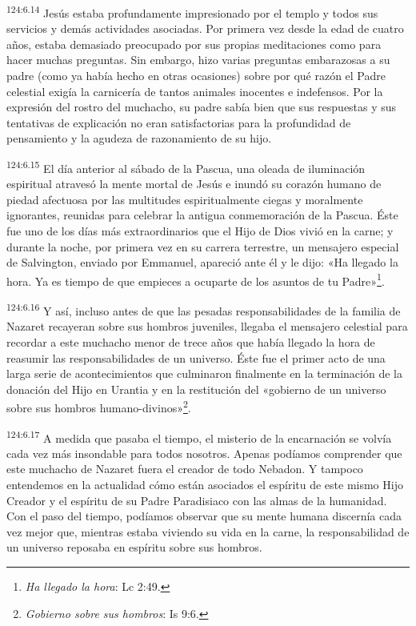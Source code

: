 \par
\textsuperscript{124:6.14} Jesús estaba profundamente impresionado por el templo y todos sus servicios y demás actividades asociadas. Por primera vez desde la edad de cuatro años, estaba demasiado preocupado por sus propias meditaciones como para hacer muchas preguntas. Sin embargo, hizo varias preguntas embarazosas a su padre (como ya había hecho en otras ocasiones) sobre por qué razón el Padre celestial exigía la carnicería de tantos animales inocentes e indefensos. Por la expresión del rostro del muchacho, su padre sabía bien que sus respuestas y sus tentativas de explicación no eran satisfactorias para la profundidad de pensamiento y la agudeza de razonamiento de su hijo.

\par
\textsuperscript{124:6.15} El día anterior al sábado de la Pascua, una oleada de iluminación espiritual atravesó la mente mortal de Jesús e inundó su corazón humano de piedad afectuosa por las multitudes espiritualmente ciegas y moralmente ignorantes, reunidas para celebrar la antigua conmemoración de la Pascua. Éste fue uno de los días más extraordinarios que el Hijo de Dios vivió en la carne; y durante la noche, por primera vez en su carrera terrestre, un mensajero especial de Salvington, enviado por Emmanuel, apareció ante él y le dijo: «Ha llegado la hora. Ya es tiempo de que empieces a ocuparte de los asuntos de tu Padre»\footnote{\textit{Ha llegado la hora}: Lc 2:49.}.

\par
\textsuperscript{124:6.16} Y así, incluso antes de que las pesadas responsabilidades de la familia de Nazaret recayeran sobre sus hombros juveniles, llegaba el mensajero celestial para recordar a este muchacho menor de trece años que había llegado la hora de reasumir las responsabilidades de un universo. Éste fue el primer acto de una larga serie de acontecimientos que culminaron finalmente en la terminación de la donación del Hijo en Urantia y en la restitución del «gobierno de un universo sobre sus hombros humano-divinos»\footnote{\textit{Gobierno sobre sus hombros}: Is 9:6.}.

\par
\textsuperscript{124:6.17} A medida que pasaba el tiempo, el misterio de la encarnación se volvía cada vez más insondable para todos nosotros. Apenas podíamos comprender que este muchacho de Nazaret fuera el creador de todo Nebadon. Y tampoco entendemos en la actualidad cómo están asociados el espíritu de este mismo Hijo Creador y el espíritu de su Padre Paradisiaco con las almas de la humanidad. Con el paso del tiempo, podíamos observar que su mente humana discernía cada vez mejor que, mientras estaba viviendo su vida en la carne, la responsabilidad de un universo reposaba en espíritu sobre sus hombros.


